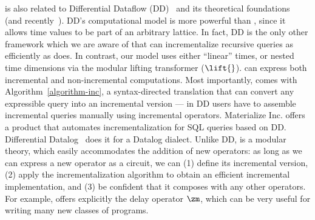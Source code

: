 \dbsp is also related to Differential Dataflow
(DD)~\cite{mcsherry-cidr13, murray-sosp13} and its theoretical
foundations~\cite{abadi-fossacs15} (and
recently~\cite{mcsherry-vldb20,chothia-vldb16}).  DD's computational
model is more powerful than \dbsp, since it allows time values to be
part of an arbitrary lattice.  In fact, DD is the only other framework
which we are aware of that can incrementalize recursive queries as
efficiently as \dbsp does.  In contrast, our model uses either
``linear'' times, or nested time dimensions via the modular lifting
transformer ($\lift{}$).  \dbsp can express both incremental and
non-incremental computations.  Most importantly, \dbsp comes with
Algorithm~\ref{algorithm-inc}, a syntax-directed translation that can
convert any expressible query into an incremental version --- in DD
users have to assemble incremental queries manually using incremental
operators.  Materialize Inc. offers a product that automates
incrementalization for SQL queries based on DD.  Differential
Datalog~\cite{ryzhyk-datalog19} does it for a Datalog dialect.  Unlike
DD, \dbsp is a modular theory, which easily accommodates the addition
of new operators: as long as we can express a new operator as a \dbsp
circuit, we can (1) define its incremental version, (2) apply the
incrementalization algorithm to obtain an efficient incremental
implementation, and (3) be confident that it composes with any other
operators.  For example, \dbsp offers explicitly the delay operator
$\zm$, which can be very useful for writing many new classes of
programs.
